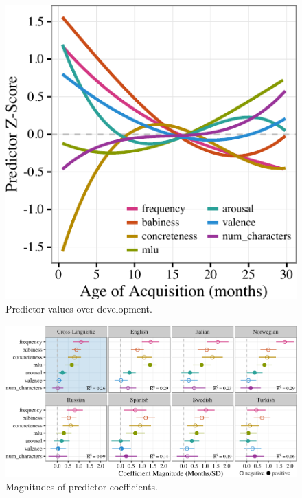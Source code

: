 \documentclass[10pt, letterpaper]{article}
\newenvironment{CodeChunk}{}{}
\begin{document}
\begin{CodeChunk}
\begin{figure}[!hb]

{\centering \includegraphics{figs/devo-1} 

}

\caption[Predictor values over development]{Predictor values over development.}\label{fig:devo}
\end{figure}
\end{CodeChunk}

\begin{CodeChunk}
\begin{figure}[tb]

{\centering \includegraphics{figs/coefs-1} 

}

\caption[Magnitudes of predictor coefficients]{Magnitudes of predictor coefficients.}\label{fig:coefs}
\end{figure}
\end{CodeChunk}
\end{document}
